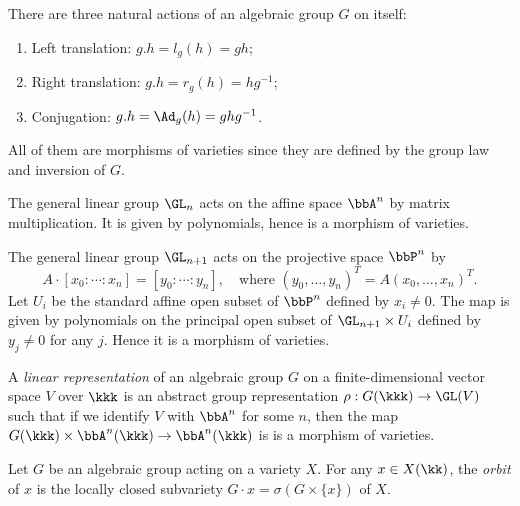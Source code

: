     \begin{example}\label{eg:algebraic_group_acts_on_itself}
        There are three natural actions of an algebraic group \(G\) on itself:
        \begin{enumerate}
            \item Left translation: \(g.h = l_g(h) = gh\);
            \item Right translation: \(g.h = r_g(h) = hg^{-1}\);
            \item Conjugation: \(g.h = \Ad_g(h) = ghg^{-1}\).
        \end{enumerate}
        All of them are morphisms of varieties since they are defined by the group law and inversion of \(G\).
    \end{example}

    \begin{example}\label{eg:linear_action_of_general_linear_group}
        The general linear group \(\GL_n\) acts on the affine space \(\bbA^n\) by matrix multiplication.
        It is given by polynomials, hence is a morphism of varieties.
    \end{example}

    \begin{example}\label{eg:linear_group_acts_on_projective_space}
        The general linear group \(\GL_{n+1}\) acts on the projective space \(\bbP^n\) by
        \[
            A \cdot [x_0:\cdots:x_n] = [y_0:\cdots:y_n], \quad \text{where } (y_0,\ldots,y_n)^T = A(x_0,\ldots,x_n)^T.
        \]
        Let \(U_i\) be the standard affine open subset of \(\bbP^n\) defined by \(x_i \neq 0\).
        The map is given by polynomials on the principal open subset of \(\GL_{n+1} \times U_i\) defined by \(y_j \neq 0\) for any \(j\).
        Hence it is a morphism of varieties.
    \end{example}

    \begin{definition}\label{def:linear_representation}
        A \emph{linear representation} of an algebraic group \(G\) on a finite-dimensional vector space \(V\) over \(\kkk\) is an abstract group representation \(\rho: G(\kkk) \to \GL(V)\) such that 
        if we identify \(V\) with \(\bbA^n\) for some \(n\), then the map \(G(\kkk) \times \bbA^n(\kkk) \to \bbA^n(\kkk)\) is 
        is a morphism of varieties. 
    \end{definition}

    \begin{definition}\label{def:orbit_of_algebraic_group_action}
        Let \(G\) be an algebraic group acting on a variety \(X\).
        For any \(x \in X(\kk)\), the \emph{orbit} of \(x\) is the locally closed subvariety \(G \cdot x = \sigma(G \times \{x\})\) of \(X\).
    \end{definition}

